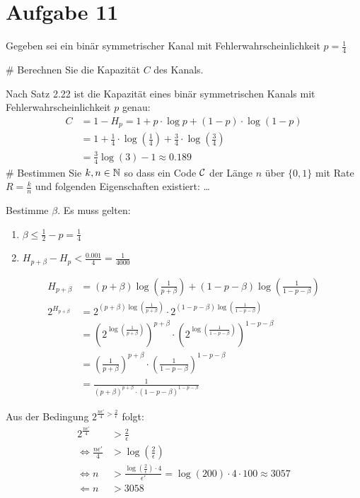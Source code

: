 
\setcounter{MaxMatrixCols}{20}

\section*{Aufgabe 11}
Gegeben sei ein binär symmetrischer Kanal mit Fehlerwahrscheinlichkeit $p = \frac{1}{4}$
\begin{myList}
#
Berechnen Sie die Kapazität $C$ des Kanals.

Nach Satz 2.22 ist die Kapazität eines binär symmetrischen Kanals mit Fehlerwahrscheinlichkeit $p$ genau:
\begin{align*}
	C &= 1 - H_p = 1 + p \cdot \log p + (1-p)\cdot \log (1-p) \\
	&= 1 + \frac{1}{4} \cdot \log \left(\frac{1}{4}\right) + \frac{3}{4}\cdot \log \left(\frac{3}{4}\right) \\
	&= \frac{3}{4} \log(3) - 1 \approx  0.189
\end{align*} 
#
Bestimmen Sie $k,n \in \mathbb{N}$ so dass ein Code $\mathcal{C}$ der Länge $n$ über $\lbrace 0,1 \rbrace$ mit Rate $R = \frac{k}{n}$ und folgenden Eigenschaften existiert: \ldots

Bestimme $\beta$.
Es muss gelten:
\begin{enumerate}
	\item $\beta \leq \frac{1}{2} - p = \frac{1}{4}$
	\item $ H_{p+\beta} - H_{p} < \frac{0.001}{4} = \frac{1}{4000}$
\end{enumerate}

\begin{align*}
	H_{p+\beta} &= (p+ \beta) \log \left( \frac{1}{p + \beta}\right) + (1 -p - \beta) \log \left( \frac{1}{1-p-\beta}\right) \\
	2^{H_{p + \beta}} &= 2^{(p+ \beta) \log \left( \frac{1}{p + \beta}\right)} \cdot 2^{(1 -p - \beta) \log \left( \frac{1}{1-p-\beta}\right)} \\
	&=\left(2^{\log \left( \frac{1}{p + \beta}\right)}\right)^{p+\beta} \cdot \left(2^{\log \left( \frac{1}{1-p-\beta}\right)}\right)^{1 - p - \beta} \\
	&=\left(\frac{1}{p+\beta} \right)^{p + \beta} \cdot \left(\frac{1}{1-p-\beta} \right)^{1-p-\beta} \\
	&= \frac{1}{(p+\beta)^{p+\beta} \cdot (1-p-\beta)^{1-p-\beta}}
\end{align*}

Aus der Bedingung $2^{\frac{n \epsilon'}{4} > \frac{2}{\epsilon}}$ folgt:
\begin{align*}
	2^{\frac{n \epsilon'}{4}} &> \frac{2}{\epsilon} \\
	\Leftrightarrow \frac{n \epsilon'}{4} &> \log \left( \frac{2}{\epsilon}\right)\\
	\Leftrightarrow n &> \frac{\log\left( \frac{2}{\epsilon}\right) \cdot 4}{\epsilon'} = \log(200) \cdot 4 \cdot 100 \approx 3057 \\
	\Leftarrow n &> 3058
\end{align*}


\end{myList}
